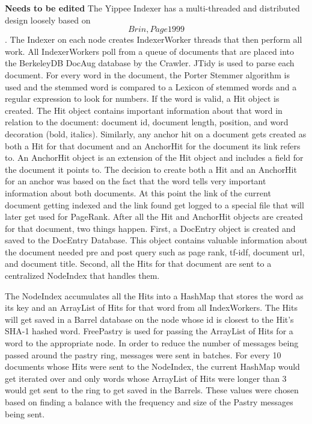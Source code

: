 \documentclass[11pt, letterpaper, oneside, twocolumn]{article}
\begin{document}
\textbf{Needs to be edited}
The Yippee Indexer has a multi-threaded and distributed design loosely based on \[Brin, Page 1999\]\cite{pagerank}. The Indexer on each node creates IndexerWorker threads that then perform all work. All IndexerWorkers poll from a queue of documents that are placed into the BerkeleyDB DocAug database by the Crawler. JTidy is used to parse each document. For every word in the document, the Porter Stemmer algorithm is used and the stemmed word is compared to a Lexicon of stemmed words and a regular expression to look for numbers. If the word is valid, a Hit object is created. The Hit object contains important information about that word in relation to the document: document id, document length, position, and word decoration (bold, italics). Similarly, any anchor hit on a document gets created as both a Hit for that document and an AnchorHit for the document its link refers to. An AnchorHit object is an extension of the Hit object and includes a field for the document it points to. The decision to create both a Hit and an AnchorHit for an anchor was based on the fact that the word tells very important information about both documents. At this point the link of the current document getting indexed and the link found get logged to a special file that will later get used for PageRank. After all the Hit and AnchorHit objects are created for that document, two things happen. First, a DocEntry object is created and saved to the DocEntry Database. This object contains valuable information about the document needed pre and post query such as page rank, tf-idf, document url, and document title. Second, all the Hits for that document are sent to a centralized NodeIndex that handles them.

The NodeIndex accumulates all the Hits into a HashMap that stores the word as its key and an ArrayList of Hits for that word from all IndexWorkers. The Hits will get saved in a Barrel database on the node whose id is closest to the Hit’s SHA-1 hashed word. FreePastry is used for passing the ArrayList of Hits for a word to the appropriate node. In order to reduce the number of messages being passed around the pastry ring, messages were sent in batches. For every 10 documents whose Hits were sent to the NodeIndex, the current HashMap would get iterated over and only words whose ArrayList of Hits were longer than 3 would get sent to the ring to get saved in the Barrels. These values were chosen based on finding a balance with the frequency and size of the Pastry messages being sent. 
\end{document}
